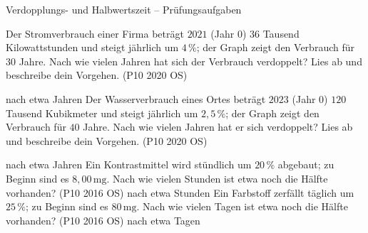 \begin{aufgabe}{Verdopplungs- und Halbwertszeit – Prüfungsaufgaben}
\begin{teile}
\teil Der Stromverbrauch einer Firma beträgt $2021$ (Jahr $0$) $36$ Tausend Kilowattstunden und steigt jährlich um $4\,\%$; der Graph zeigt den Verbrauch für $30$ Jahre. Nach wie vielen Jahren hat sich der Verbrauch verdoppelt? Lies ab und beschreibe dein Vorgehen. \hfill (P10 2020 OS) \\

\begin{ksys}[xmin=0,xmax=30,ymin=0,ymax=130,xstep=2,ystep=10,xlabel=t in Jahren,ylabel=Tausend kWh,ablesen]  \end{ksys}
nach etwa \leerfeld Jahren
\teil Der Wasserverbrauch eines Ortes beträgt $2023$ (Jahr $0$) $120$ Tausend Kubikmeter und steigt jährlich um $2{,}5\,\%$; der Graph zeigt den Verbrauch für $40$ Jahre. Nach wie vielen Jahren hat er sich verdoppelt? Lies ab und beschreibe dein Vorgehen. \hfill (P10 2020 OS) \\

\begin{ksys}[xmin=0,xmax=40,ymin=0,ymax=350,xstep=4,ystep=50,xlabel=t in Jahren,ylabel=Tausend m³,ablesen]  \end{ksys}
nach etwa \leerfeld Jahren
\teil Ein Kontrastmittel wird stündlich um $20\,\%$ abgebaut; zu Beginn sind es $8{,}00\,\mathrm{mg}$. Nach wie vielen Stunden ist etwa noch die Hälfte vorhanden? \hfill (P10 2016 OS)  nach etwa \leerfeld Stunden
\teil Ein Farbstoff zerfällt täglich um $25\,\%$; zu Beginn sind es $80\,\mathrm{mg}$. Nach wie vielen Tagen ist etwa noch die Hälfte vorhanden? \hfill (P10 2016 OS)  nach etwa \leerfeld Tagen
\end{teile}
\end{aufgabe}
